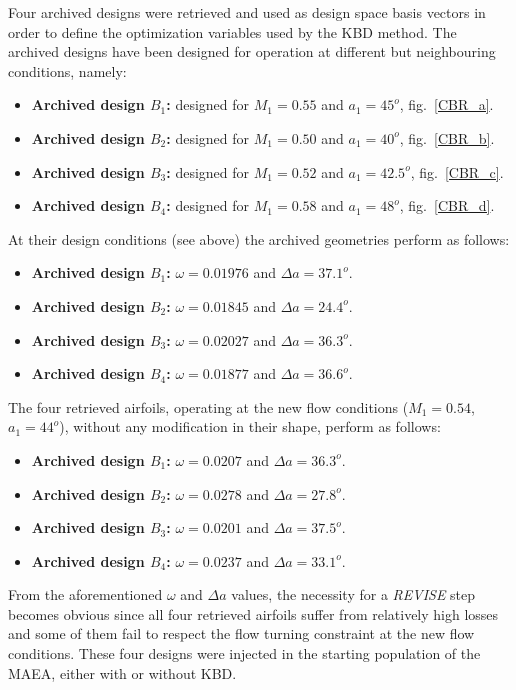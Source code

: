 Four archived designs were retrieved and used as design space basis vectors in order to define the optimization variables used by the KBD method. 
The archived designs have been designed for operation at different but neighbouring conditions, namely:
\begin{itemize}
\item{\textbf{Archived design $B_1$:}} designed for $M_1=0.55$ and $a_1=45^o$, fig.\ \ref{CBR_a}.
\item{\textbf{Archived design $B_2$:}} designed for $M_1=0.50$ and $a_1=40^o$, fig.\ \ref{CBR_b}.
\item{\textbf{Archived design $B_3$:}} designed for $M_1=0.52$ and $a_1=42.5^o$, fig.\ \ref{CBR_c}. 
\item{\textbf{Archived design $B_4$:}} designed for $M_1=0.58$ and $a_1=48^o$, fig.\ \ref{CBR_d}.
\end{itemize}
At their design conditions (see above) the archived geometries perform as follows: 
\begin{itemize}
\item{\textbf{Archived design $B_1$:}} $\omega=0.01976$ and $\Delta a=37.1^o$.
\item{\textbf{Archived design $B_2$:}} $\omega=0.01845$ and $\Delta a=24.4^o$.
\item{\textbf{Archived design $B_3$:}} $\omega=0.02027$ and $\Delta a=36.3^o$.
\item{\textbf{Archived design $B_4$:}} $\omega=0.01877$ and $\Delta a=36.6^o$.
\end{itemize}
The four retrieved airfoils, operating at the new flow conditions ($M_1=0.54$, $a_1=44^o$), without any modification in their shape, perform as follows:
\begin{itemize}
\item{\textbf{Archived design $B_1$:}} $\omega=0.0207$ and $\Delta a=36.3^o$.
\item{\textbf{Archived design $B_2$:}} $\omega=0.0278$ and $\Delta a=27.8^o$.
\item{\textbf{Archived design $B_3$:}} $\omega=0.0201$ and $\Delta a=37.5^o$.
\item{\textbf{Archived design $B_4$:}} $\omega=0.0237$ and $\Delta a=33.1^o$.
\end{itemize}
From the aforementioned $\omega$ and $\Delta a$ values, the necessity for a \textit{REVISE} step becomes obvious since all four retrieved airfoils suffer from relatively high losses and some of them fail to respect the flow turning constraint at the new flow conditions. These four designs were injected in the starting population of the MAEA, either with or without KBD.  


